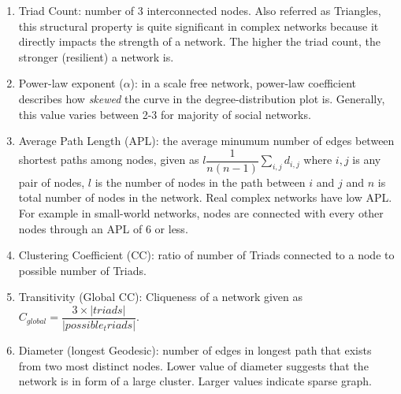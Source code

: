 \begin{enumerate}
		\item Triad Count: number of 3 interconnected nodes. Also referred as Triangles, this structural property is quite significant in complex networks because it directly impacts the strength of a network. The higher the triad count, the stronger (resilient) a network is.
		
		\item Power-law exponent ($\alpha$): in a scale free network, power-law coefficient describes how \textit{skewed} the curve in the degree-distribution plot is. Generally, this value varies between 2-3 for majority of social networks.
		
		\item Average Path Length (APL): the average minumum number of edges between shortest paths among nodes, given as $l\dfrac{1}{n(n-1)}\sum_{i,j}d_{i,j}$ where $i,j$ is any pair of nodes, $l$ is the number of nodes in the path between $i$ and $j$ and $n$ is total number of nodes in the network. Real complex networks have low APL. For example in small-world networks, nodes are connected with every other nodes through an APL of 6 or less. %
		
		\item Clustering Coefficient (CC): ratio of number of Triads connected to a node to possible number of Triads\cite{watts1998}.
		
		\item Transitivity (Global CC): Cliqueness of a network given as $C_{global}=\dfrac{3\times |triads|}{|possible_triads|}$.
		
		
			
		\item Diameter (longest Geodesic): number of edges in longest path that exists from two most distinct nodes. Lower value of diameter suggests that the network is in form of a large cluster. Larger values indicate sparse graph.
		

\end{enumerate}
